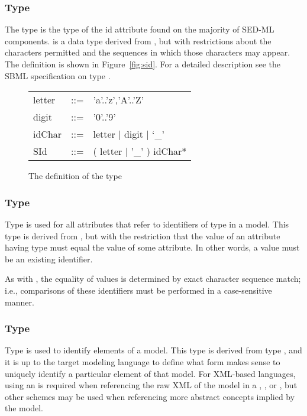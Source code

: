 \subsubsection[\element{SId}]{Type }
\label{type:sid}
The type  is the type of the id attribute found on the majority of SED-ML components.  is a data type derived from , but with restrictions about the characters permitted and the sequences in which those characters may appear. The definition is shown in Figure~\vref{fig:sid}. For a detailed description see the SBML specification on type  \citep{HBH+10}.

\begin{figure}[hbt]
  \ttfamily
  \small
  \centering
  \begin{tabular}{lll}
    letter & ::= & 'a'..'z','A'..'Z'\\
    digit  & ::= & '0'..'9'\\
    idChar & ::= & letter | digit | `\_'\\
    SId    & ::= & ( letter | '\_' ) idChar*\\
  \end{tabular}
  \vspace*{-1ex}
  \caption{The definition of the type }
  \label{fig:sid}
\end{figure}

\subsubsection[\SIdRef]{Type \SIdRef}
\label{type:sidref}
Type  is used for all attributes that refer to identifiers of type \SId in a model. This type is derived from \SId, but with the restriction that the value of an attribute having type  must equal the value of some \SId attribute. In other words, a  value must be an existing identifier.

As with \SId, the equality of  values is determined by exact character sequence match; i.e., comparisons of these identifiers must be performed in a case-sensitive manner.

\begin{blockChanged}
\subsubsection[\element{TargetType}]{Type }
\label{type:target}
Type  is used to identify elements of a model.  This type is derived from type , and it is up to the target modeling language to define what form makes sense to uniquely identify a particular element of that model.  For XML-based languages, using an  is required when referencing the raw XML of the model in a \ChangeXML, \AddXML, or \RemoveXML, but other schemes may be used when referencing more abstract concepts implied by the model.
\end{blockChanged}

